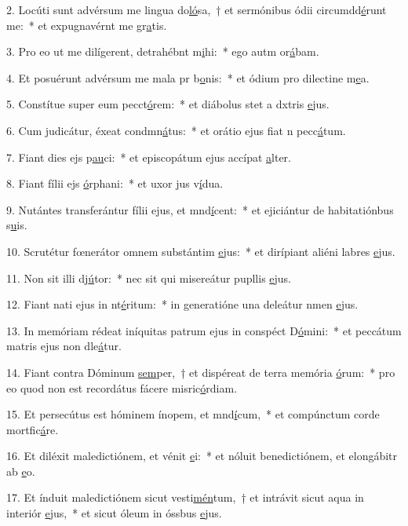 2. Locúti sunt advérsum me lingua do\uline{ló}sa,~† et sermónibus ódii circumdd\uline{é}runt me:~* et expugnavérnt me gr\uline{a}tis.\par 
3. Pro eo ut me dilígerent, detrahébnt m\uline{i}hi:~* ego autm or\uline{á}bam.\par 
4. Et posuérunt advérsum me mala pr b\uline{o}nis:~* et ódium pro dilectine m\uline{e}a.\par 
5. Constítue super eum pecct\uline{ó}rem:~* et diábolus stet a dxtris \uline{e}jus.\par 
6. Cum judicátur, éxeat condmn\uline{á}tus:~* et orátio ejus fiat n pecc\uline{á}tum.\par 
7. Fiant dies ejs p\uline{au}ci:~* et episcopátum ejus accípat \uline{a}lter.\par 
8. Fiant fílii ejs \uline{ó}rphani:~* et uxor jus v\uline{í}dua.\par 
9. Nutántes transferántur fílii ejus, et mnd\uline{í}cent:~* et ejiciántur de habitatiónbus s\uline{u}is.\par 
10. Scrutétur fœnerátor omnem substántim \uline{e}jus:~* et dirípiant aliéni labres \uline{e}jus.\par 
11. Non sit illi dj\uline{ú}tor:~* nec sit qui misereátur pupllis \uline{e}jus.\par 
12. Fiant nati ejus in nt\uline{é}ritum:~* in generatióne una deleátur nmen \uline{e}jus.\par 
13. In memóriam rédeat iníquitas patrum ejus in conspéct D\uline{ó}mini:~* et peccátum matris ejus non dle\uline{á}tur.\par 
14. Fiant contra Dóminum \uline{sem}per,~† et dispéreat de terra memória \uline{ó}rum:~* pro eo quod non est recordátus fácere misric\uline{ó}rdiam.\par 
15. Et persecútus est hóminem ínopem, et mnd\uline{í}cum,~* et compúnctum corde mortfic\uline{á}re.\par 
16. Et diléxit maledictiónem, et vénit \uline{e}i:~* et nóluit benedictiónem, et elongábitr ab \uline{e}o.\par 
17. Et índuit maledictiónem sicut vesti\uline{mén}tum,~† et intrávit sicut aqua in interiór \uline{e}jus,~* et sicut óleum in óssbus \uline{e}jus.\par 
